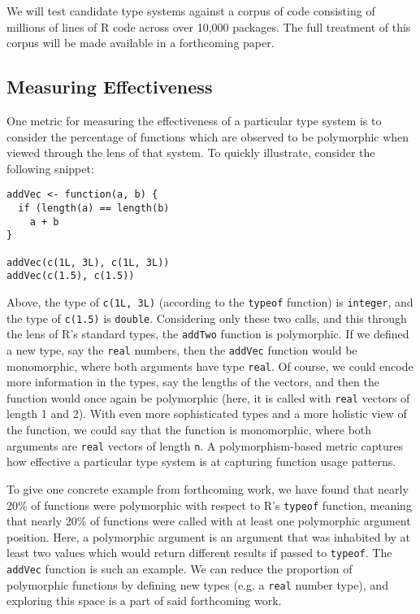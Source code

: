 \documentclass[sigplan,10pt,review,anonymous]{acmart}\settopmatter{printfolios=true,printccs=false,printacmref=false}
\begin{document}
We will test candidate type systems against a corpus of code consisting of millions of lines of R code across over 10,000 packages.
The full treatment of this corpus will be made available in a forthcoming paper.

%
%
\subsection{Measuring Effectiveness}

One metric for measuring the effectiveness of a particular type system is to consider the percentage of functions which are observed to be polymorphic when viewed through the lens of that system. 
To quickly illustrate, consider the following snippet:

\begin{lstlisting}
addVec <- function(a, b) {
  if (length(a) == length(b)
    a + b
}

addVec(c(1L, 3L), c(1L, 3L))
addVec(c(1.5), c(1.5))
\end{lstlisting}

Above, the type of {\tt c(1L, 3L)} (according to the {\tt typeof} function) is {\tt integer}, and the type of {\tt c(1.5)} is {\tt double}.
Considering only these two calls, and this through the lens of R's standard types, the {\tt addTwo} function is polymorphic.
If we defined a new type, say the {\tt real} numbers, then the {\tt addVec} function would be monomorphic, where both arguments have type {\tt real}.
Of course, we could encode more information in the types, say the lengths of the vectors, and then the function would once again be polymorphic (here, it is called with {\tt real} vectors of length 1 and 2).
With even more sophisticated types and a more holistic view of the function, we could say that the function is monomorphic, where both arguments are {\tt real} vectors of length {\tt n}.
A polymorphism-based metric captures how effective a particular type system is at capturing function usage patterns.

To give one concrete example from forthcoming work, we have found that nearly 20\% of functions were polymorphic with respect to R's {\tt typeof} function, meaning that nearly 20\% of functions were called with at least one polymorphic argument position.
Here, a polymorphic argument is an argument that was inhabited by at least two values which would return different results if passed to {\tt typeof}.
The {\tt addVec} function is such an example.
We can reduce the proportion of polymorphic functions by defining new types (e.g. a {\tt real} number type), and exploring this space is a part of said forthcoming work.
\end{document}
